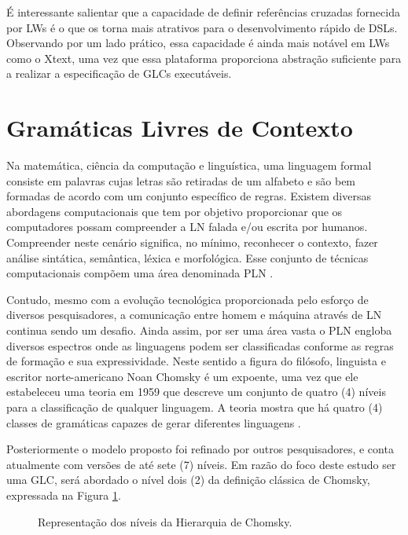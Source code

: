 É interessante salientar que a capacidade de definir referências cruzadas fornecida por \acp{LW} é o que os torna mais atrativos para o desenvolvimento rápido de \acp{DSL}. Observando por um lado prático, essa capacidade é ainda mais notável em \acp{LW} como o Xtext, uma vez que essa plataforma proporciona abstração suficiente para a realizar a especificação de \acp{GLC} executáveis.

\section{Gramáticas Livres de Contexto} \label{ssec:GLC}

Na matemática, ciência da computação e linguística, uma linguagem formal consiste em palavras cujas letras são retiradas de um alfabeto e são bem formadas de acordo com um conjunto específico de regras. 
Existem diversas abordagens computacionais que tem por objetivo proporcionar que os computadores possam compreender a \ac{LN} falada e/ou escrita por humanos. 
Compreender neste cenário significa, no mínimo, reconhecer o contexto, fazer análise sintática, semântica, léxica e morfológica. 
Esse conjunto de técnicas computacionais compõem uma área denominada \ac{PLN} \cite{Jurafsky:2009}.

Contudo, mesmo com a evolução tecnológica proporcionada pelo esforço de diversos pesquisadores, a comunicação entre homem e máquina através de \ac{LN} continua sendo um desafio. 
Ainda assim, por ser uma área vasta o \ac{PLN} engloba diversos espectros onde as linguagens podem ser classificadas conforme as regras de formação e sua expressividade. 
Neste sentido a figura do filósofo, linguista e escritor norte-americano Noan Chomsky é um expoente, uma vez que ele estabeleceu uma teoria em 1959 que descreve um conjunto de quatro (4) níveis para a classificação de qualquer linguagem. 
A teoria mostra que há quatro (4) classes de gramáticas capazes de gerar diferentes linguagens \cite{Linz:2016}.

Posteriormente o modelo proposto foi refinado por outros pesquisadores, e conta atualmente com versões de até sete (7) níveis. 
Em razão do foco deste estudo ser uma \ac{GLC}, será abordado o nível dois (2) da definição clássica de Chomsky, expressada na Figura \ref{fig:Chomsky}.

\begin{figure}[!htb]
    \centering
    \caption{Representação dos níveis da Hierarquia de Chomsky.}
    \label{fig:Chomsky}
    
\end{figure}

